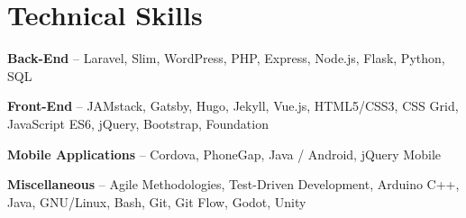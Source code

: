 \section{Technical Skills}
\begin{small}
	\parbox[t][][t]{\linewidth}{
		\textbf{Back-End} -- Laravel, Slim, WordPress, PHP, Express, Node.js, Flask, Python, SQL
		\smallbreak
	}
	\parbox[t][][t]{\linewidth}{
	\textbf{Front-End} -- JAMstack, Gatsby, Hugo, Jekyll, Vue.js, HTML5/CSS3, CSS Grid, JavaScript ES6, jQuery, Bootstrap, Foundation
	\smallbreak
}
	\parbox[t][][t]{\linewidth}{
		\textbf{Mobile Applications} -- Cordova, PhoneGap, Java / Android, jQuery Mobile
		\smallbreak
	}
	\parbox[t][][t]{\linewidth}{
	\textbf{Miscellaneous} -- Agile Methodologies, Test-Driven Development, Arduino C++, Java, GNU/Linux, Bash, Git, Git Flow, Godot, Unity
}
\end{small}
